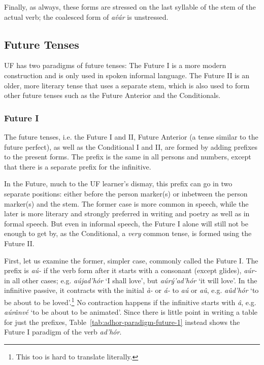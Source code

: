 \documentclass[a4paper, 12pt, twoside, final]{article}
\let \w \textit
\begin{document}
Finally, as always, these forms are stressed on the last syllable of the stem of the actual verb; the coalesced form
of \w{av́ár} is unstressed.

\subsection{Future Tenses}
UF has two paradigms of future tenses: The Future I is a more modern construction and is only used in spoken informal
language. The Future II is an older, more literary tense that uses a separate stem, which is also used to form other future
tenses such as the Future Anterior and the Conditionals.

\subsubsection{Future I}\label{subsubsec:future-i}
The future tenses, i.e. the Future I and II, Future Anterior (a tense similar to the future perfect), as well
as the Conditional I and II, are formed by adding prefixes to the present forms. The prefix is the same in all persons and numbers,
except that there is a separate prefix for the infinitive.

In the Future, much to the UF learner’s dismay, this prefix can go in two separate positions: either before the person marker(s) or
inbetween the person marker(s) and the stem. The former case is more common in speech, while the later is more literary
and strongly preferred in writing and poetry as well as in formal speech. But even in informal speech, the Future I alone
will still not be enough to get by, as the Conditional, a \textit{very} common tense, is formed using the Future II.

First, let us examine the former, simpler case, commonly called the Future I. The prefix is \w{aú-} if the verb form
after it starts with a consonant (except glides), \w{aúr-} in all other cases; e.g. \w{aújad’hór} ‘I shall love’, but
\w{aúrý’ad’hór} ‘it will love’. In the infinitive passive, it
contracts with the initial \w{à-} or \w{á-} to \w{aú} or \w{aû}, e.g. \w{aûd’hór} ‘to be about to be loved’.\footnote{This too is
hard to translate literally.} No contraction happens
if the infinitive starts with \w{â}, e.g. \w{aúrânvé} ‘to be about to be animated’. Since
there is little point in writing a table for just the prefixes, Table~\ref{tab:adhor-paradigm-future-1} instead shows the Future I paradigm
of the verb \emph{ad’hór}.
\end{document}

